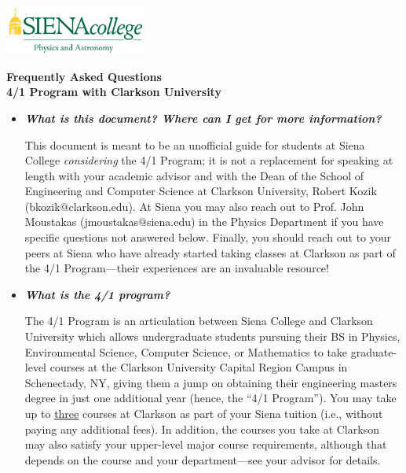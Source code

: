 \documentclass[12pt]{article}
\begin{document}
\hfill \includegraphics[width=0.35\textwidth]{siena_phys_astro_print_crop.jpg}

\vspace{0.2cm}
\begin{center}
{\LARGE {\bf Frequently Asked Questions}} \\
\medskip
{\Large {\bf 4/1 Program with Clarkson University}} 
\end{center}
\vspace{0.3cm}


\begin{itemize}
\item{{\bf {\em What is this document? Where can I get for more information?}} 

This document is meant to be an unofficial guide for students at Siena College
\emph{considering} the 4/1 Program; it is not a replacement for speaking at
length with your academic advisor and with the Dean of the School of Engineering
and Computer Science at Clarkson University, Robert Kozik (bkozik@clarkson.edu).
At Siena you may also reach out to Prof. John Moustakas (jmoustakas@siena.edu)
in the Physics Department if you have specific questions not answered below.
Finally, you should reach out to your peers at Siena who have already started
taking classes at Clarkson as part of the 4/1 Program---their experiences are an
invaluable resource!}

\item{{\bf {\em What is the 4/1 program?}}

The 4/1 Program is an articulation between Siena College and Clarkson University
which allows undergraduate students pursuing their BS in Physics, Environmental
Science, Computer Science, or Mathematics to take graduate-level courses at the
Clarkson University Capital Region Campus in Schenectady, NY, giving them a jump
on obtaining their engineering masters degree in just one additional year
(hence, the ``4/1 Program'').  You may take up to \underline{three} courses at
Clarkson as part of your Siena tuition (i.e., without paying any additional
fees).  In addition, the courses you take at Clarkson may also satisfy your
upper-level major course requirements, although that depends on the course and
your department---see your advisor for details.}


\end{itemize}
\end{document}
